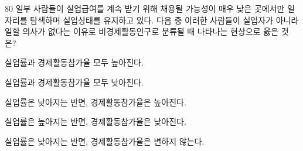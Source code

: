 \begin{question}{80}
일부 사람들이 실업급여를 계속 받기 위해 채용될 가능성이 매우 낮은 곳에서만 일자리를 탐색하며 실업상태를 유지하고 있다. 다음 중 이러한 사람들이 실업자가 아니라 일할 의사가 없다는 이유로 비경제활동인구로 분류될 때 나타나는 현상으로 옳은 것은?
\begin{choices}
  \item 실업률과 경제활동참가율 모두 높아진다.
  \item 실업률과 경제활동참가율 모두 낮아진다.
  \item 실업률은 낮아지는 반면, 경제활동참가율은 높아진다.
  \item 실업률은 높아지는 반면, 경제활동참가율은 낮아진다.
  \item 실업률은 낮아지는 반면, 경제활동참가율은 변하지 않는다.
\end{choices}
\end{question}

